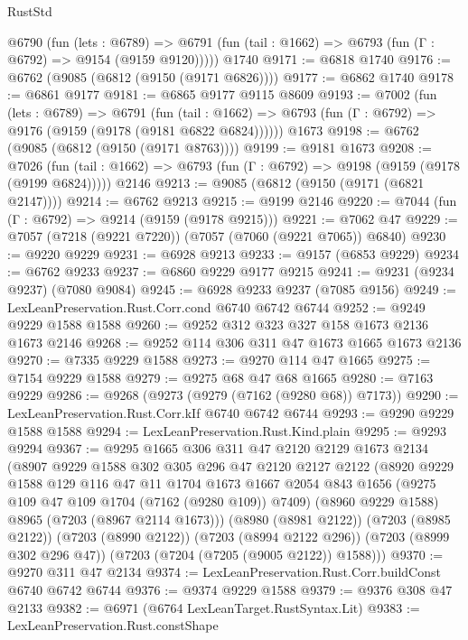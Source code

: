 \begin{lexlean}{RustStd}
\begin{coremodule}
{\begin{coremodule}
{{{{{{{{{{{{{{{{{{{{{{{{{{{{{{{{{{{{{{{{{{{{    @6790
      (fun (lets : @6789) =>
      @6791 (fun (tail : @1662) => @6793 (fun (Γ : @6792) => @9154 (@9159 @9120)))))
    @1740
@9171 := @6818 @1740
@9176 := @6762 (@9085 (@6812 (@9150 (@9171 @6826))))
@9177 := @6862 @1740
@9178 := @6861 @9177
@9181 := @6865 @9177 @9115 @8609
@9193 := @7002
    (fun (lets : @6789) =>
    @6791
      (fun (tail : @1662) => @6793 (fun (Γ : @6792) => @9176 (@9159 (@9178 (@9181 @6822 @6824))))))
    @1673
@9198 := @6762 (@9085 (@6812 (@9150 (@9171 @8763))))
@9199 := @9181 @1673
@9208 := @7026
    (fun (tail : @1662) => @6793 (fun (Γ : @6792) => @9198 (@9159 (@9178 (@9199 @6824)))))
    @2146
@9213 := @9085 (@6812 (@9150 (@9171 (@6821 @2147))))
@9214 := @6762 @9213
@9215 := @9199 @2146
@9220 := @7044 (fun (Γ : @6792) => @9214 (@9159 (@9178 @9215)))
@9221 := @7062 @47
@9229 := @7057 (@7218 (@9221 @7220)) (@7057 (@7060 (@9221 @7065)) @6840)
@9230 := @9220 @9229
@9231 := @6928 @9213
@9233 := @9157 (@6853 @9229)
@9234 := @6762 @9233
@9237 := @6860 @9229 @9177 @9215
@9241 := @9231 (@9234 @9237) (@7080 @9084)
@9245 := @6928 @9233 @9237 (@7085 @9156)
@9249 := LexLeanPreservation.Rust.Corr.cond @6740 @6742 @6744
@9252 := @9249 @9229 @1588 @1588
@9260 := @9252 @312 @323 @327 @158 @1673 @2136 @1673 @2146
@9268 := @9252 @114 @306 @311 @47 @1673 @1665 @1673 @2136
@9270 := @7335 @9229 @1588
@9273 := @9270 @114 @47 @1665
@9275 := @7154 @9229 @1588
@9279 := @9275 @68 @47 @68 @1665
@9280 := @7163 @9229
@9286 := @9268 (@9273 (@9279 (@7162 (@9280 @68)) @7173))
@9290 := LexLeanPreservation.Rust.Corr.kIf @6740 @6742 @6744
@9293 := @9290 @9229 @1588 @1588
@9294 := LexLeanPreservation.Rust.Kind.plain
@9295 := @9293 @9294
@9367 := @9295
    @1665
    @306
    @311
    @47
    @2120
    @2129
    @1673
    @2134
    (@8907
      @9229
      @1588
      @302
      @305
      @296
      @47
      @2120
      @2127
      @2122
      (@8920
        @9229
        @1588
        @129
        @116
        @47
        @11
        @1704
        @1673
        @1667
        @2054
        @843
        @1656
        (@9275 @109 @47 @109 @1704 (@7162 (@9280 @109)) @7409)
        (@8960 @9229 @1588)
        @8965
        (@7203 (@8967 @2114 @1673)))
      (@8980 (@8981 @2122))
      (@7203 (@8985 @2122))
      (@7203 (@8990 @2122))
      (@7203 (@8994 @2122 @296))
      (@7203 (@8999 @302 @296 @47))
      (@7203 (@7204 (@7205 (@9005 @2122)) @1588)))
@9370 := @9270 @311 @47 @2134
@9374 := LexLeanPreservation.Rust.Corr.buildConst @6740 @6742 @6744
@9376 := @9374 @9229 @1588
@9379 := @9376 @308 @47 @2133
@9382 := @6971 (@6764 LexLeanTarget.RustSyntax.Lit)
@9383 := LexLeanPreservation.Rust.constShape
}}}}}}}}}}}}}}}}}}}}}}}}}}}}}}}}}}}}}}}}}}}}
\end{coremodule}}
\end{coremodule}
\end{lexlean}
